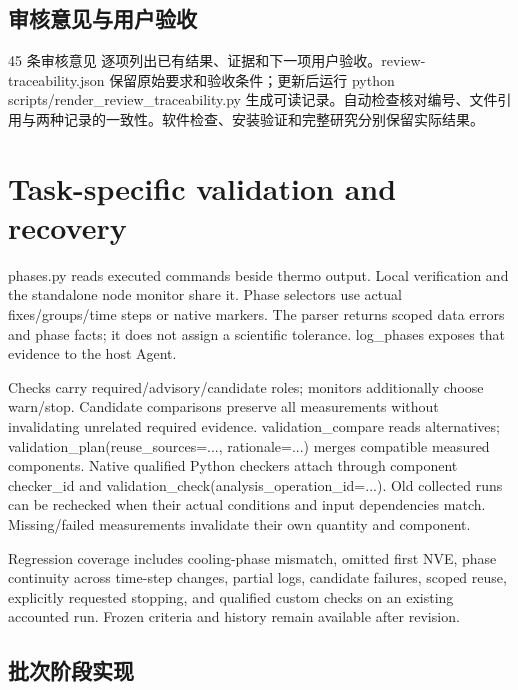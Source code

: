 \documentclass[11pt,a4paper]{ctexart}
\begin{document}
\subsection{审核意见与用户验收}


45 条审核意见 逐项列出已有结果、证据和下一项用户验收。review-traceability.json 保留原始要求和验收条件；更新后运行 python scripts/\allowbreak{}render\_\allowbreak{}review\_\allowbreak{}traceability.py 生成可读记录。自动检查核对编号、文件引用与两种记录的一致性。软件检查、安装验证和完整研究分别保留实际结果。

\section{Task-specific validation and recovery}


phases.py reads executed commands beside thermo output. Local verification and the standalone node monitor share it. Phase selectors use actual fixes/\allowbreak{}groups/\allowbreak{}time steps or native markers. The parser returns scoped data errors and phase facts; it does not assign a scientific tolerance. log\_\allowbreak{}phases exposes that evidence to the host Agent.



Checks carry required/\allowbreak{}advisory/\allowbreak{}candidate roles; monitors additionally choose warn/\allowbreak{}stop. Candidate comparisons preserve all measurements without invalidating unrelated required evidence. validation\_\allowbreak{}compare reads alternatives; validation\_\allowbreak{}plan(reuse\_\allowbreak{}sources=..., rationale=...) merges compatible measured components. Native qualified Python checkers attach through component checker\_\allowbreak{}id and validation\_\allowbreak{}check(analysis\_\allowbreak{}operation\_\allowbreak{}id=...). Old collected runs can be rechecked when their actual conditions and input dependencies match. Missing/\allowbreak{}failed measurements invalidate their own quantity and component.



Regression coverage includes cooling-phase mismatch, omitted first NVE, phase continuity across time-step changes, partial logs, candidate failures, scoped reuse, explicitly requested stopping, and qualified custom checks on an existing accounted run. Frozen criteria and history remain available after revision.



\subsection{批次阶段实现}
\end{document}
